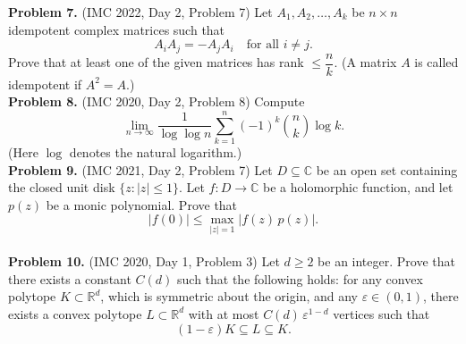 \documentclass{article}
\newcommand{\R}{\mathbb{R}}
\newcommand{\C}{\mathbb{C}}
\begin{document}
\textbf{Problem 7.} (IMC 2022, Day 2, Problem 7)
Let \( A_1, A_2, \ldots, A_k \) be \( n \times n \) idempotent complex matrices such that
\[
A_i A_j = -A_j A_i \quad \text{for all } i \neq j.
\]
Prove that at least one of the given matrices has rank \( \leq \dfrac{n}{k} \).
(A matrix \( A \) is called idempotent if \( A^2 = A \).)
\\

\textbf{Problem 8.} (IMC 2020, Day 2, Problem 8)
Compute
\[
\lim_{n \to \infty} \frac{1}{\log \log n} \sum_{k=1}^{n} (-1)^k \binom{n}{k} \log k.
\]
(Here \( \log \) denotes the natural logarithm.)
\\

\textbf{Problem 9.} (IMC 2021, Day 2, Problem 7)
Let \( D \subseteq \C \) be an open set containing the closed unit disk \( \{z : |z| \leq 1\} \).
Let \( f : D \to \C \) be a holomorphic function, and let \( p(z) \) be a monic polynomial. Prove that
\[
|f(0)| \leq \max_{|z| = 1} |f(z)\, p(z)|.
\]
\\

\textbf{Problem 10.} (IMC 2020, Day 1, Problem 3)
Let \( d \geq 2 \) be an integer. Prove that there exists a constant \( C(d) \) such that the following holds:
for any convex polytope \( K \subset \R^d \), which is symmetric about the origin, and any \( \varepsilon \in (0, 1) \),
there exists a convex polytope \( L \subset \R^d \) with at most \( C(d)\, \varepsilon^{1 - d} \) vertices such that
\[
(1 - \varepsilon) K \subseteq L \subseteq K.
\]
\end{document}
